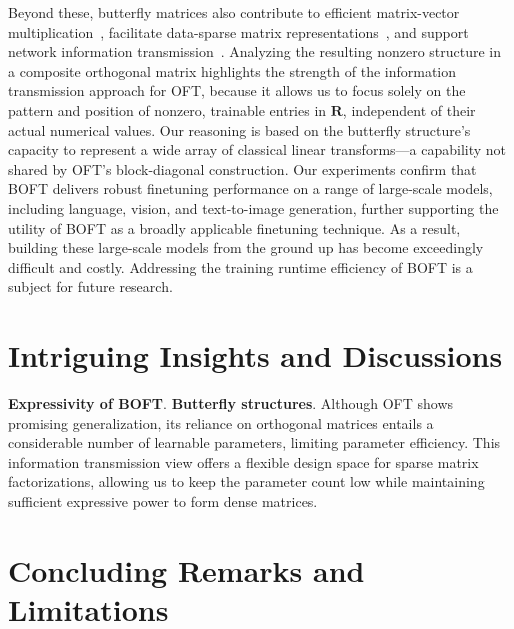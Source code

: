     \!\!\!\!\! Beyond these, butterfly matrices also contribute to efficient matrix-vector multiplication~\cite{michielssen1996multilevel,o2010algorithm}, facilitate data-sparse matrix representations~\cite{li2015butterfly}, and support network information transmission~\cite{klasing1994broadcasting,li2003linear,rajasingh2016transmission}. Analyzing the resulting nonzero structure in a composite orthogonal matrix highlights the strength of the information transmission approach for OFT, because it allows us to focus solely on the pattern and position of nonzero, trainable entries in $\bm{R}$, independent of their actual numerical values. Our reasoning is based on the butterfly structure’s capacity to represent a wide array of classical linear transforms—a capability not shared by OFT’s block-diagonal construction. Our experiments confirm that BOFT delivers robust finetuning performance on a range of large-scale models, including language, vision, and text-to-image generation, further supporting the utility of BOFT as a broadly applicable finetuning technique. As a result, building these large-scale models from the ground up has become exceedingly difficult and costly. Addressing the training runtime efficiency of BOFT is a subject for future research. \section{Intriguing Insights and Discussions}

\textbf{Expressivity of BOFT}. \textbf{Butterfly structures}. Although OFT shows promising generalization, its reliance on orthogonal matrices entails a considerable number of learnable parameters, limiting parameter efficiency. This information transmission view offers a flexible design space for sparse matrix factorizations, allowing us to keep the parameter count low while maintaining sufficient expressive power to form dense matrices. 

\section{Concluding Remarks and Limitations}

